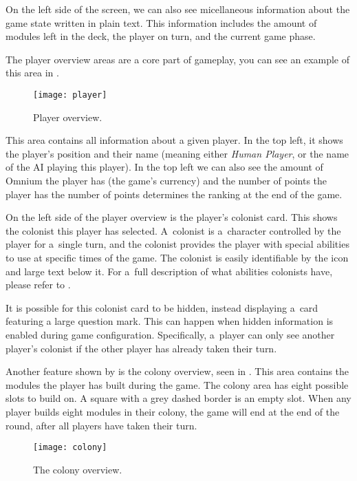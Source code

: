 On the left side of the screen, we can also see micellaneous information about the
game state written in plain text. This information includes the amount of modules
left in the deck, the player on turn, and the current game phase.

The player overview areas are a core part of gameplay, you can see an example
of this area in .

\begin{figure}[ht]
\centerline{\mbox{\texttt{[image: player]}}}
\caption{Player overview.}\label{ud:player}
\end{figure}

This area contains all information about a given player. In the top left,
it shows the player's position and their name (meaning either \emph{Human Player},
or the name of the AI playing this player). In the top left we can also see
the amount of Omnium the player has (the game's currency) and the number of points
the player has the number of points determines the ranking at the end of the game.

On the left side of the player overview is the player's colonist card. This shows
the colonist this player has selected. A~colonist is a~character controlled
by the player for a~single turn, and the colonist provides the player with
special abilities to use at specific times of the game. The colonist is
easily identifiable by the icon and large text below it. For a~full description
of what abilities colonists have, please refer to .

It is possible for this colonist card to be hidden, instead displaying a~card
featuring a large question mark. This can happen when hidden information is enabled
during game configuration. Specifically, a~player can only see another player's
colonist if the other player has already taken their turn.

Another feature shown by  is the colony overview, seen in
. This area contains the modules the player has built during
the game. The colony area has eight possible slots to build on. A square with
a grey dashed border is an empty slot. When any player
builds eight modules in their colony, the game will end at the end of the round,
after all players have taken their turn.

\begin{figure}[ht]
\centerline{\mbox{\texttt{[image: colony]}}}
\caption{The colony overview.}\label{ud:colony}
\end{figure}

